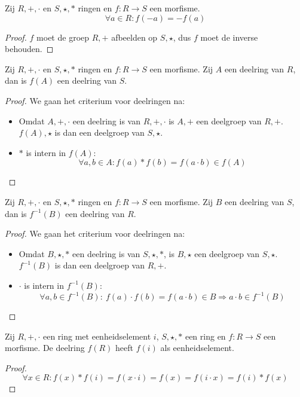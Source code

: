 \documentclass[main.tex]{subfiles}
\begin{document}
\begin{ei}
  Zij $R,+,\cdot$ en $S,\star,*$ ringen en $f:R \rightarrow S$ een morfisme.
  \[ \forall a \in R: f(-a) = -f(a) \]

  \begin{proof}
    $f$ moet de groep $R,+$ afbeelden op $S,\star$, dus $f$ moet de inverse behouden.
  \end{proof}
\end{ei}

\begin{ei}
  Zij $R,+,\cdot$ en $S,\star,*$ ringen en $f:R \rightarrow S$ een morfisme.
  Zij $A$ een deelring van $R$, dan is $f(A)$ een deelring van $S$.

  \begin{proof}
    We gaan het criterium voor deelringen na:
    \begin{itemize}
    \item Omdat $A,+,\cdot$ een deelring is van $R,+,\cdot$ is $A,+$ een deelgroep van $R,+$.
      $f(A),\star$ is dan een deelgroep van $S,\star$.
    \item $*$ is intern in $f(A)$:
      \[ \forall a,b \in A: f(a) * f(b) = f(a\cdot b) \in f(A) \]
    \end{itemize}
  \end{proof}
\end{ei}

\begin{ei}
  Zij $R,+,\cdot$ en $S,\star,*$ ringen en $f:R \rightarrow S$ een morfisme.
  Zij $B$ een deelring van $S$, dan is $f^{-1}(B)$ een deelring van $R$.

  \begin{proof}
    We gaan het criterium voor deelringen na:
    \begin{itemize}
    \item Omdat $B,\star,*$ een deelring is van $S,\star,*$, is $B,\star$ een deelgroep van $S,\star$.
      $f^{-1}(B)$ is dan een deelgroep van $R,+$. 
    \item $\cdot$ is intern in $f^{-1}(B)$:
      \[ \forall a,b \in f^{-1}(B):\ f(a) \cdot f(b) = f(a \cdot b) \in B \Rightarrow a \cdot b \in f^{-1}(B) \]
    \end{itemize}
  \end{proof}
\end{ei}

\begin{ei}
  Zij $R,+,\cdot$ een ring met eenheidselement $i$, $S,\star,*$ een ring en $f:R \rightarrow S$ een morfisme.
  De deelring $f(R)$ heeft $f(i)$ als eenheidselement.

  \begin{proof}
    \[ \forall x\in R: f(x) *f(i) = f(x \cdot i) = f(x) = f(i \cdot x) = f(i) * f(x) \]
  \end{proof}
\end{ei}
\end{document}
